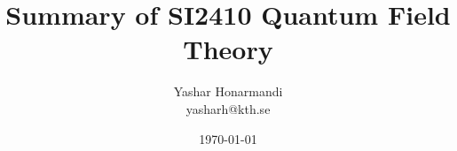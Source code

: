 \documentclass[a4paper, 11pt]{article}
\title{Summary of SI2410 Quantum Field Theory}
\author{Yashar Honarmandi \\ yasharh@kth.se}
\date{\today}
\begin{document}
\maketitle

\begin{abstract}
	
\end{abstract}

\thispagestyle{empty}

\newpage

\tableofcontents

\newpage











\end{document}
